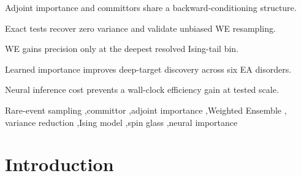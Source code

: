 \documentclass[a4paper,fleqn]{cas-sc}
\begin{document}
\begin{highlights}
\item Adjoint importance and committors share a backward-conditioning structure.
\item Exact tests recover zero variance and validate unbiased WE resampling.
\item WE gains precision only at the deepest resolved Ising-tail bin.
\item Learned importance improves deep-target discovery across six EA disorders.
\item Neural inference cost prevents a wall-clock efficiency gain at tested scale.
\end{highlights}

\begin{keywords}
Rare-event sampling \sep committor \sep adjoint importance \sep Weighted Ensemble \sep
variance reduction \sep Ising model \sep spin glass \sep neural importance
\end{keywords}

\maketitle

\section{Introduction}\label{sec:intro}
\end{document}
